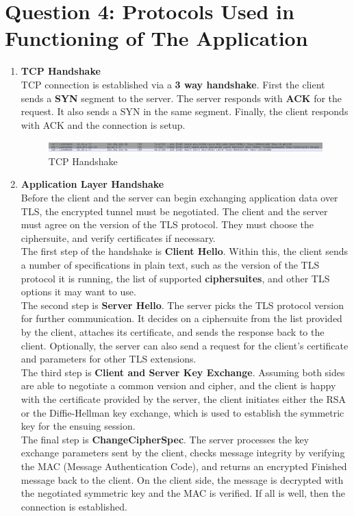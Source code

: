 \documentclass[a4paper,10pt]{article}
\begin{document}
\section*{Question 4: Protocols Used in Functioning of The Application}
\begin{enumerate}
	\item \textbf{\color{Magenta} \large TCP Handshake}\\
	TCP connection is established via a \textbf{3 way handshake}. First the client sends a \textbf{SYN} segment to the server. The server responds with \textbf{ACK} for the request. It also sends a SYN in the same segment. Finally, the client responds with ACK and the connection is setup.
	\begin{figure}[h]
		\includegraphics[width=\textwidth]{Images/TCP_handshake}
		\caption{TCP Handshake}
	\end{figure}
	\item \textbf{\color{Magenta} \large Application Layer Handshake}\\
	Before the client and the server can begin exchanging application data over TLS, the encrypted tunnel must be negotiated. The client and the server must agree on the version of the TLS protocol. They must choose the ciphersuite, and verify certificates if necessary.
	\\
	The first step of the handshake is \textbf{Client Hello}. Within this, the client sends a number of specifications in plain text, such as the version of the TLS protocol it is running, the list of supported \textbf{ciphersuites}, and other TLS options it may want to use.
	\\The second step is \textbf{Server Hello}. The server picks the TLS protocol version for further communication. It decides on a ciphersuite from the list provided by the client, attaches its certificate, and sends the response back to the client. Optionally, the server can also send a request for the client’s certificate and parameters for other TLS extensions. 
	\\The third step is \textbf{Client and Server Key Exchange}. Assuming both sides are able to negotiate a common version and cipher, and the client is happy with the certificate provided by the server, the client initiates either the RSA or the Diffie-Hellman key exchange, which is used to establish the symmetric key for the ensuing session.
	\\The final step is \textbf{ChangeCipherSpec}. The server processes the key exchange parameters sent by the client, checks message integrity by verifying the MAC (Message Authentication Code), and returns an encrypted Finished message back to the client. On the client side, the message is decrypted with the negotiated symmetric key and the MAC is verified. If all is well, then the connection is established.

\end{enumerate}
\end{document}
